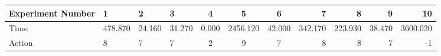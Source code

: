 \documentclass[8pt]{article}
\begin{document}
\begin{landscape}
\begin{tabular}{ | l | l | l | l | c | c | c | r | r | r | r | }
 \hline 
Experiment Number & 1 & 2 & 3 & 4 & 5 & 6 & 7 & 8 & 9 & 10\\ \hline
Time & 478.870 & 24.160 & 31.270 & 0.000 & 2456.120 & 42.000 & 342.170 & 223.930 & 38.470 & 3600.020\\ \hline
Action & 8 & 7 & 7 & 2 & 9 & 7 & 8 & 8 & 7 & -1\\ \hline\end{tabular}
\end{landscape}
\end{document}
